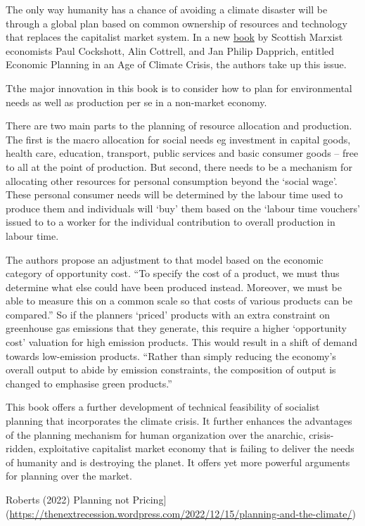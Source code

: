 \documentclass[
]{book}
\begin{document}
The only way humanity has a chance of avoiding a climate disaster will be through a global plan based on common ownership of resources and technology that replaces the capitalist market system. In a new \href{}{book} by Scottish Marxist economists Paul Cockshott, Alin Cottrell, and Jan Philip Dapprich, entitled Economic Planning in an Age of Climate Crisis, the authors take up this issue.

Tthe major innovation in this book is to consider how to plan for environmental needs as well as production per se in a non-market economy.

There are two main parts to the planning of resource allocation and production. The first is the macro allocation for social needs eg investment in capital goods, health care, education, transport, public services and basic consumer goods -- free to all at the point of production. But second, there needs to be a mechanism for allocating other resources for personal consumption beyond the `social wage'. These personal consumer needs will be determined by the labour time used to produce them and individuals will `buy' them based on the `labour time vouchers' issued to to a worker for the individual contribution to overall production in labour time.

The authors propose an adjustment to that model based on the economic category of opportunity cost. ``To specify the cost of a product, we must thus determine what else could have been produced instead. Moreover, we must be able to measure this on a common scale so that costs of various products can be compared.'' So if the planners `priced' products with an extra constraint on greenhouse gas emissions that they generate, this require a higher `opportunity cost' valuation for high emission products. This would result in a shift of demand towards low-emission products. ``Rather than simply reducing the economy's overall output to abide by emission constraints, the composition of output is changed to emphasise green products.''

This book offers a further development of technical feasibility of socialist planning that incorporates the climate crisis. It further enhances the advantages of the planning mechanism for human organization over the anarchic, crisis-ridden, exploitative capitalist market economy that is failing to deliver the needs of humanity and is destroying the planet. It offers yet more powerful arguments for planning over the market.

Roberts (2022) Planning not Pricing{]}(\url{https://thenextrecession.wordpress.com/2022/12/15/planning-and-the-climate/})
\end{document}
